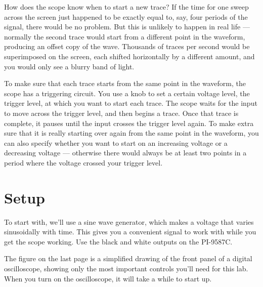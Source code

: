 How does the scope know when to start a new trace? If the
time for one sweep across the screen just happened to be
exactly equal to, say, four periods of the signal, there
would be no problem. But this is unlikely to happen in real
life --- normally the second trace would start from a
different point in the waveform, producing an offset copy of
the wave. Thousands of traces per second would be superimposed
on the screen, each shifted horizontally by a different
amount, and you would only see a blurry band of light.

To make sure that each trace starts from the same point in
the waveform, the scope has a triggering circuit. You use a
knob to set a certain voltage level, the trigger level, at
which you want to start each trace. The scope waits for the
input to move across the trigger level, and then begins a
trace. Once that trace is complete, it pauses until the
input crosses the trigger level again. To make extra sure
that it is really starting over again from the same point in
the waveform, you can also specify whether you want to start
on an increasing voltage or a decreasing voltage ---
otherwise there would always be at least two points in a
period where the voltage crossed your trigger level.

\section*{Setup}


To start with, we'll use a sine wave generator, which makes
a voltage that varies sinusoidally with time. This gives you
a convenient signal to work with while you get the scope working.
Use the black and white outputs on the PI-9587C.

The figure on the last page is a simplified
drawing of the front panel of a digital oscilloscope, showing
only the most important controls you'll need for this lab.
When you turn on the oscilloscope, it will take a while to start
up.


